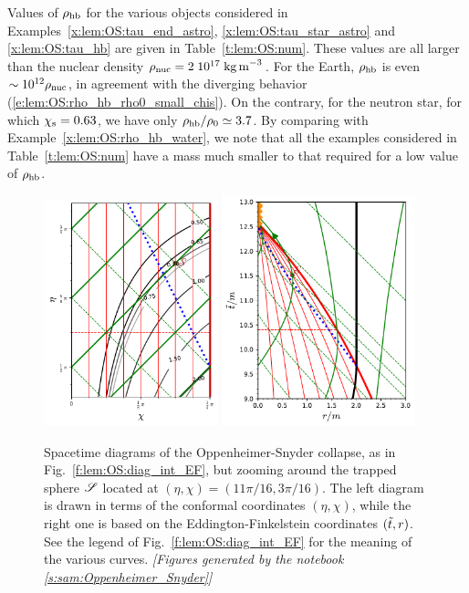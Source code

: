 \begin{example}
Values of $\rho_{\rm hb}$ for the various objects considered in
Examples~\ref{x:lem:OS:tau_end_astro}, \ref{x:lem:OS:tau_star_astro}
and \ref{x:lem:OS:tau_hb}
are given in Table~\ref{t:lem:OS:num}. These values are all
larger than the nuclear density $\rho_{\rm nuc} = 2\; 10^{17} \; {\rm kg\, m}^{-3}$.
For the Earth, $\rho_{\rm hb}$ is even $\sim 10^{12} \rho_{\rm nuc}$,
in agreement with the diverging behavior (\ref{e:lem:OS:rho_hb_rho0_small_chis}).
On the contrary, for the neutron star, for which $\chi_{\rm s} = 0.63$,
we have only $\rho_{\rm hb} / \rho_0 \simeq 3.7$. By comparing with
Example~\ref{x:lem:OS:rho_hb_water},
we note that all the examples
considered in Table~\ref{t:lem:OS:num} have a mass much smaller to that
required for a low value of $\rho_{\rm hb}$.
\end{example}

\begin{figure}
\centerline{
\includegraphics[width=0.45\textwidth]{lem_OS_diag_int_zoom.pdf}\qquad
\includegraphics[width=0.5\textwidth]{lem_OS_diag_EF_zoom.pdf}
}
\caption[]{\label{f:lem:OS:diag_trapped} \footnotesize
Spacetime diagrams of the Oppenheimer-Snyder collapse, as in Fig.~\ref{f:lem:OS:diag_int_EF},
but zooming around the trapped sphere $\mathscr{S}$ located at $(\eta,\chi) = (11\pi/16, 3\pi/16)$.
The left diagram is drawn in terms of the
conformal coordinates $(\eta,\chi)$, while the right one is based on
the Eddington-Finkelstein coordinates $({\tilde t}, r)$.
See the legend of Fig.~\ref{f:lem:OS:diag_int_EF} for the meaning of the
various curves.
\textsl{[Figures generated by the notebook \ref{s:sam:Oppenheimer_Snyder}]}
}
\end{figure}




